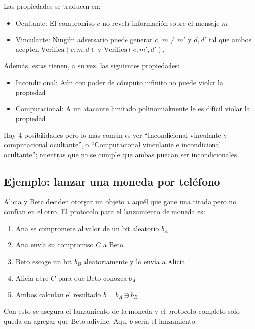   Las propiedades se traducen en:
  \begin{itemize}
    \item Ocultante: El compromiso $c$ no revela información sobre el mensaje $m$ 
    \item Vinculante: Ningún adversario puede generar $c$, $m\neq m'$ y $d,d'$ tal que 
      ambos acepten $\text{Verifica}(c, m, d)$ y $\text{Verifica}(c, m', d')$.
  \end{itemize}

  Además, estas tienen, a su vez, las siguientes propiedades:
  \begin{itemize}
    \item Incondicional: Aún con poder de cómputo infinito no puede violar la propiedad 
    \item Computacional: A un atacante limitado polinomialmente le es difícil violar la propiedad
  \end{itemize}

  Hay 4 posibilidades pero lo más común es ver ``Incondicional vinculante y computacional ocultante'',
  o ``Computacional vinculante e incondicional ocultante''; mientras que no se cumple que ambas puedan 
  ser incondicionales.

  \subsection{Ejemplo: lanzar una moneda por teléfono}
  Alicia y Beto deciden otorgar un objeto a aquél que gane una tirada pero no confían 
  en el otro.
  El protocolo para el lanzamiento de moneda es:
  \begin{enumerate}
    \item Ana se compromete al valor de un bit aleatorio $b_A$
    \item Ana envía su compromiso $C$ a Beto
    \item Beto escoge un bit $b_B$ aleatoriamente y lo envía a Alicia 
    \item Alicia abre $C$ para que Beto conozca $b_A$ 
    \item Ambos calculan el resultado $b = b_A \oplus b_B$
  \end{enumerate}

  Con esto se asegura el lanzamiento de la moneda y el protocolo completo solo 
  queda en agregar que Beto adivine.
  Aquí $b$ sería el lanzamiento.

